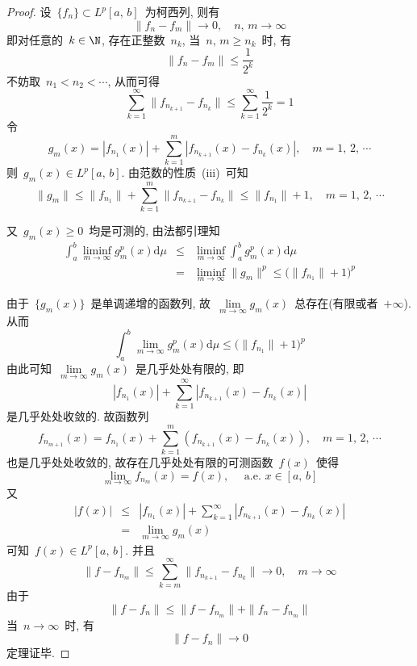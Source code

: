 \begin{proof}
设~$\{f_n\}\subset L^p[a,\,b]$~为柯西列, 则有
\[
\|f_{n}-f_{m}\|\rightarrow 0,\quad n,\,m\rightarrow \infty
\]
即对任意的~$k \in \N$, 存在正整数~$n_{k}$, 当~$n,\,m \geqslant n_{k}$~时, 有
\[
\|f_{n}-f_{m}\|\leqslant \frac{1}{2^{k}}
\]
不妨取~$n_{1}<n_{2}<\cdots$, 从而可得
\[
\sum_{k=1}^{\infty}\|f_{n_{k+1}}-f_{n_{k}}\|\leqslant \sum_{k=1}^{\infty}\frac{1}{2^{k}}=1
\]
令
\[
g_{m}(x)=|f_{n_{1}}(x)|+\sum_{k=1}^{m}|f_{n_{k+1}}(x)-f_{n_{k}}(x)|,\quad m=1,\,2,\,\cdots
\]
则~$g_{m}(x)\in L^p[a,\,b]$. 由范数的性质~(iii)~可知
\[
\|g_{m}\|\leqslant \|f_{n_{1}}\|+\sum_{k=1}^{m}\|f_{n_{k+1}}-f_{n_{k}}\|\leqslant \|f_{n_{1}}\|+1,\quad m=1,\,2,\,\cdots
\]

又~$g_{m}(x)\geqslant 0$~均是可测的, 由法都引理知
\begin{eqnarray*}
\int_{a}^{b}\liminf_{m \to \infty}g_{m}^{p}(x)\mathrm{d}\mu &\leqslant& \liminf_{m \to \infty}\int_{a}^{b}g_{m}^{p}(x)\mathrm{d}\mu \\
&=&\liminf_{m \to \infty}\|g_{m}\|^{p}\leqslant \big(\|f_{n_{1}}\|+1\big)^{p}
\end{eqnarray*}

由于~$\{g_{m}(x)\}$~是单调递增的函数列, 故~$\lim\limits_{m \to \infty}g_{m}(x)$~总存在(有限或者~$+\infty$). 从而
\[
\int_{a}^{b}\lim\limits_{m \to \infty}g_{m}^{p}(x)\mathrm{d}\mu\leqslant \big(\|f_{n_{1}}\|+1 \big)^{p}
\]
由此可知~$\lim\limits_{m \to \infty}g_{m}(x)$~是几乎处处有限的, 即
\[
|f_{n_{1}}(x)|+\sum_{k=1}^{\infty}|f_{n_{k+1}}(x)-f_{n_{k}}(x)|
\]
是几乎处处收敛的. 故函数列
\[
f_{n_{m+1}}(x)=f_{n_{1}}(x)+\sum_{k=1}^{m}(f_{n_{k+1}}(x)-f_{n_{k}}(x)),\quad m=1,\,2,\,\cdots
\]
也是几乎处处收敛的, 故存在几乎处处有限的可测函数~$f(x)$~使得
\[
\lim\limits_{m \to \infty}f_{n_{m}}(x)=f(x),\quad \mbox{~a.e.~} x\in \left[a,\,b\right]
\]
又
\begin{eqnarray*}
|f(x)|&\leqslant & |f_{n_{1}}(x)|+\sum_{k=1}^{\infty}|f_{n_{k+1}}(x)-f_{n_{k}}(x)|\\
&=& \lim\limits_{m \to \infty}g_{m}(x)
\end{eqnarray*}
可知~$f(x)\in L^p[a,\,b]$. 并且
\[
\|f-f_{n_{m}}\|\leqslant \sum_{k=m}^{\infty}\|f_{n_{k+1}}-f_{n_{k}}\| \longrightarrow 0,\quad m\rightarrow \infty
\]
由于
\[
\|f-f_{n}\|\leqslant \|f-f_{n_{m}}\|+\|f_{n}-f_{n_{m}}\|
\]
当~$n\rightarrow \infty$~时, 有
\[
\|f-f_{n}\|\rightarrow 0
\]
定理证毕.
\end{proof}

